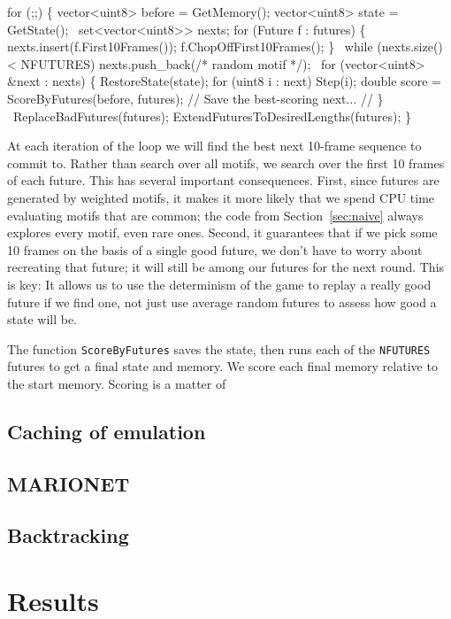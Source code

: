 \documentclass[twocolumn]{article}
\begin{document}
\begin{code}
for (;;) \{
  vector<uint8> before = GetMemory();
  vector<uint8> state = GetState();
\
  set<vector<uint8>> nexts;
  for (Future f : futures) \{
   nexts.insert(f.First10Frames());
   f.ChopOffFirst10Frames();
  \}
\ 
  while (nexts.size() < NFUTURES)
   nexts.push\_back(/* random motif */);
\ 
  for (vector<uint8> &next : nexts) \{
    RestoreState(state);
    for (uint8 i : next) Step(i);
    double score = ScoreByFutures(before, futures);
    // Save the best-scoring next...
    // 
  \}
\
  ReplaceBadFutures(futures);
  ExtendFuturesToDesiredLengths(futures);
\}
\end{code}

At each iteration of the loop we will find the best next 10-frame
sequence to commit to. Rather than search over all motifs, we search
over the first 10 frames of each future. This has several important
consequences. First, since futures are generated by weighted motifs,
it makes it more likely that we spend CPU time evaluating motifs that
are common; the code from Section~\ref{sec:naive} always explores
every motif, even rare ones. Second, it guarantees that if we pick
some 10 frames on the basis of a single good future, we don't have to
worry about recreating that future; it will still be among our futures
for the next round. This is key: It allows us to use the determinism
of the game to replay a really good future if we find one, not just
use average random futures to assess how good a state will be.

The function {\tt ScoreByFutures} saves the state, then runs each
of the {\tt NFUTURES} futures to get a final state and memory. We
score each final memory relative to the start memory. Scoring is
a matter of 


\subsection{Caching of emulation}

\subsection{MARIONET}

\subsection{Backtracking}


\section{Results}
\end{document}
